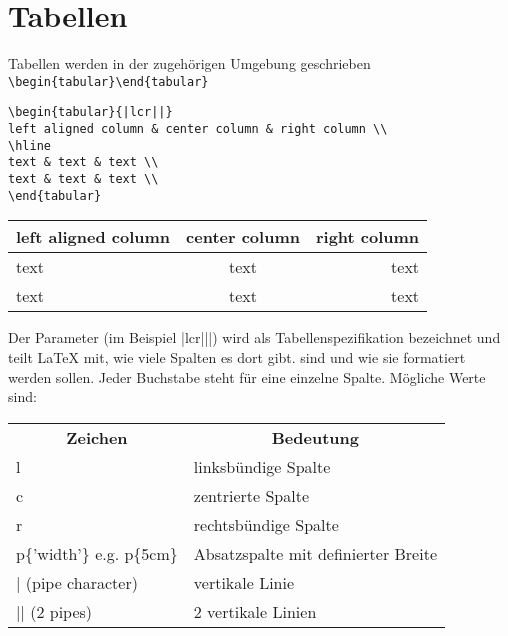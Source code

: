 \chapter{Tabellen}

Tabellen werden in der zugehörigen Umgebung geschrieben \verb|\begin{tabular}\end{tabular}|
\begin{lstlisting}[style=LaTeX,caption={Einfache Tabelle},label=lst:tab1]
\begin{tabular}{|lcr||}
left aligned column & center column & right column \\
\hline
text & text & text \\
text & text & text \\
\end{tabular}
\end{lstlisting}

\begin{tabular}{|lcr||}
	left aligned column & center column & right column \\
	\hline
	text & text & text \\
	text & text & text \\
\end{tabular}
\bigskip

Der Parameter (im Beispiel |lcr|||) wird als Tabellenspezifikation bezeichnet und teilt LaTeX mit, wie viele Spalten es dort gibt.
sind und wie sie formatiert werden sollen. Jeder Buchstabe steht für eine einzelne Spalte. Mögliche Werte sind:

\begin{table}[ht]
	\centering
	\begin{tabular}{ll}
		\multicolumn{1}{c}{\textbf{Zeichen}} & \multicolumn{1}{c}{\textbf{Bedeutung}}       \\
		l                           & linksbündige Spalte                 \\
		c                           & zentrierte Spalte                   \\
		r                           & rechtsbündige Spalte                \\
		p\{'width'\} e.g. p\{5cm\}  & Absatzspalte mit definierter Breite \\
		| (pipe character)          & vertikale Linie                     \\
		|| (2 pipes)                & 2 vertikale Linien                 
	\end{tabular}
\end{table}

